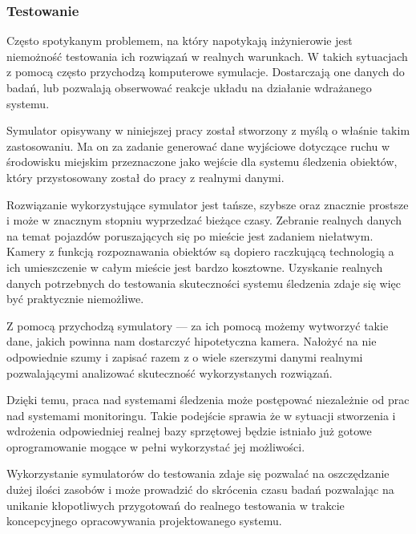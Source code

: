 \subsubsection{Testowanie}
\par{
Często spotykanym problemem, na który napotykają inżynierowie jest niemożność testowania ich rozwiązań w realnych warunkach. W takich sytuacjach z pomocą często przychodzą komputerowe symulacje. Dostarczają one danych do badań, lub pozwalają obserwować reakcje układu na działanie wdrażanego systemu.
}
\par{
Symulator opisywany w niniejszej pracy został stworzony z myślą o właśnie takim zastosowaniu. Ma on za zadanie generować dane wyjściowe dotyczące ruchu w środowisku miejskim przeznaczone jako wejście dla systemu śledzenia obiektów, który przystosowany został do pracy z realnymi danymi.
}
\par{
Rozwiązanie wykorzystujące symulator jest tańsze, szybsze oraz znacznie prostsze i może w znacznym stopniu wyprzedzać bieżące czasy.
Zebranie realnych danych na temat pojazdów poruszających się po mieście jest zadaniem niełatwym. Kamery z funkcją rozpoznawania obiektów są dopiero raczkującą technologią a ich umieszczenie w całym mieście jest bardzo kosztowne. Uzyskanie realnych danych potrzebnych do testowania skuteczności systemu śledzenia zdaje się więc być praktycznie niemożliwe.
}
\par{
Z pomocą przychodzą symulatory --- za ich pomocą możemy wytworzyć takie dane, jakich powinna nam dostarczyć hipotetyczna kamera. Nałożyć na nie odpowiednie szumy i zapisać razem z o wiele szerszymi danymi realnymi pozwalającymi analizować skuteczność wykorzystanych rozwiązań.
}
\par{
Dzięki temu, praca nad systemami śledzenia może postępować niezależnie od prac nad systemami monitoringu. Takie podejście sprawia że w sytuacji stworzenia i wdrożenia odpowiedniej realnej bazy sprzętowej będzie istniało już gotowe oprogramowanie mogące w pełni wykorzystać jej możliwości.
}
\par{
Wykorzystanie symulatorów do testowania zdaje się pozwalać na oszczędzanie dużej ilości zasobów i może prowadzić do skrócenia czasu badań pozwalając na unikanie kłopotliwych przygotowań do realnego testowania w trakcie koncepcyjnego opracowywania projektowanego systemu.
}


